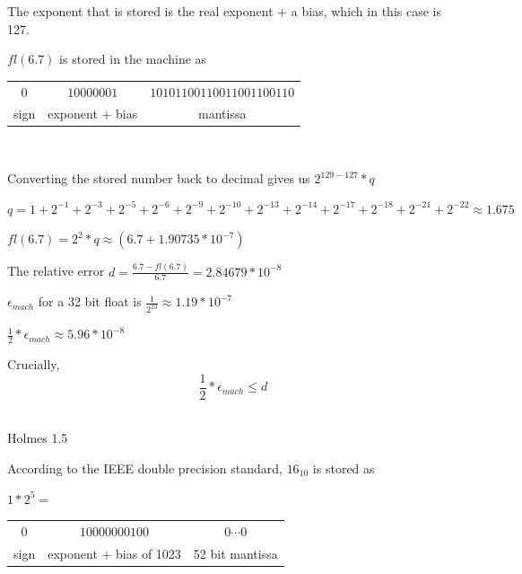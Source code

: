 	The exponent that is stored is the real exponent + a bias, which in this case is 127.

	$fl(6.7)$ is stored in the machine as

	\begin{center}
	\begin{tabular}{c | c | c}

		$0$ & $10000001$ & $10101100110011001100110$ \\

		sign & exponent + bias & mantissa \\

	\end{tabular} \\
	\end{center}

	Converting the stored number back to decimal gives us $2^{129-127} * q$

	$q = 1 + 2^{-1} + 2^{-3} + 2^{-5} + 2^{-6} + 2^{-9} + 2^{-10} + 2^{-13} + 2^{-14} + 2^{-17} + 2^{-18}+2^{-21} + 2^{-22} \approx 1.675$

	$fl(6.7) = 2^2 * q  \approx (6.7+1.90735*10^{-7})$

	The relative error $d = \frac{6.7-fl(6.7)}{6.7} = 2.84679*10^{-8}$

	$\epsilon_{mach}$ for a 32 bit float is $\frac{1}{2^{23}} \approx 1.19*10^{-7}$

	$\frac{1}{2} * \epsilon_{mach} \approx 5.96 * 10^{-8}$

	Crucially, $$\frac{1}{2} * \epsilon_{mach} \leq d$$ \\

\item Holmes 1.5

\benum

	\item According to the IEEE double precision standard, $16_{10}$ is stored as

	$1*2^{5} =$

	\begin{center}
	\begin{tabular}{c | c | c}

		$0$ & $10000000100$ & $0\cdots0$ \\

		sign & exponent + bias of 1023 & 52 bit mantissa \\

	\end{tabular} \\
	\end{center}

